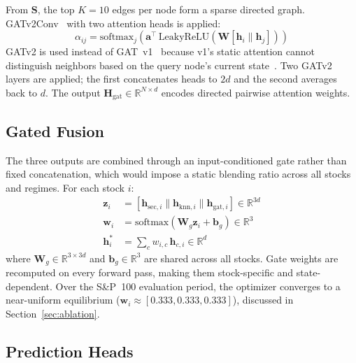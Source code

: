 \documentclass[journal]{IEEEtran}
\begin{document}
From $\mathbf{S}$, the top $K=10$ edges per node form a sparse
directed graph. GATv2Conv~\cite{brody2022attentive} with two attention
heads is applied:
\begin{equation}
  \alpha_{ij} = \mathrm{softmax}_j\!\left(
    \mathbf{a}^\top\,\mathrm{LeakyReLU}\!\left(
      \mathbf{W}[\mathbf{h}_i\parallel\mathbf{h}_j]\right)\right)
  \label{eq:gatv2}
\end{equation}
GATv2 is used instead of GAT~v1~\cite{velickovic2018graph} because
v1's static attention cannot distinguish neighbors based on the query
node's current state~\cite{brody2022attentive}. Two GATv2 layers are
applied; the first concatenates heads to $2d$ and the second averages
back to $d$. The output $\mathbf{H}_{\mathrm{gat}}\in\mathbb{R}^{N\times d}$
encodes directed pairwise attention weights.

\subsection{Gated Fusion}

The three outputs are combined through an input-conditioned gate rather
than fixed concatenation, which would impose a static blending ratio
across all stocks and regimes. For each stock $i$:
\begin{align}
  \mathbf{z}_i &= [\mathbf{h}_{\mathrm{sec},i}\parallel
                   \mathbf{h}_{\mathrm{knn},i}\parallel
                   \mathbf{h}_{\mathrm{gat},i}]\in\mathbb{R}^{3d}
                   \label{eq:concat}\\
  \mathbf{w}_i &= \mathrm{softmax}(\mathbf{W}_g\mathbf{z}_i +
                   \mathbf{b}_g)\in\mathbb{R}^3
                   \label{eq:gate_weights}\\
  \mathbf{h}_i^* &= \textstyle\sum_c w_{i,c}\,\mathbf{h}_{c,i}
                   \in\mathbb{R}^{d}
                   \label{eq:fuse}
\end{align}
where $\mathbf{W}_g\in\mathbb{R}^{3\times3d}$ and
$\mathbf{b}_g\in\mathbb{R}^3$ are shared across all stocks. Gate
weights are recomputed on every forward pass, making them stock-specific
and state-dependent. Over the S\&P~100 evaluation period, the optimizer
converges to a near-uniform equilibrium
($\mathbf{w}_i\approx[0.333,0.333,0.333]$), discussed in
Section~\ref{sec:ablation}.

\subsection{Prediction Heads}
\end{document}
